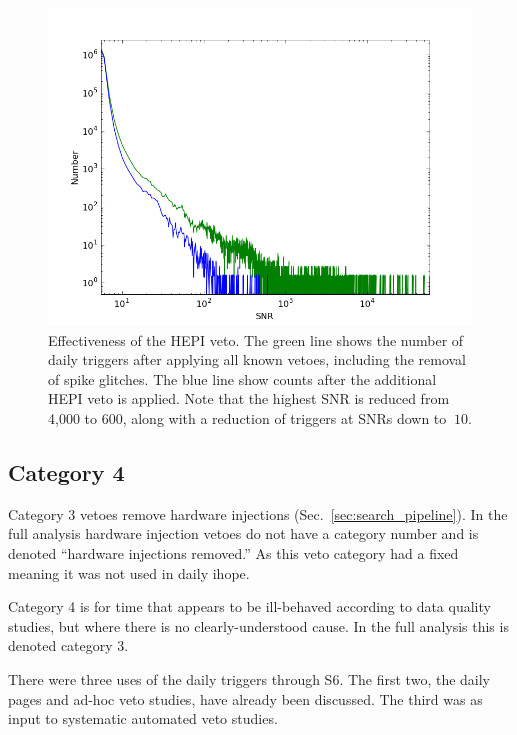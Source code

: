 \begin{figure}
  \includegraphics[width=\linewidth]{figures/detchar/L1-S6B2-snrhist_Cat1234_Spike_HEPI}
  \caption[Effectiveness of the HEPI veto] {
  \label{f:hepi_veto_effectiveness}
Effectiveness of the HEPI veto. The green line shows the number of
daily triggers after applying all known vetoes, including the removal
of spike glitches.  The blue line show counts after the additional
HEPI veto is applied.  Note that the highest SNR is reduced from 
4,000 to 600, along with a reduction of triggers at SNRs down to 
$~ 10$.}
\end{figure}


\subsection{Category 4}

Category 3 vetoes remove hardware injections
(Sec.~\ref{sec:search_pipeline}).  In the full analysis
hardware injection vetoes do not have a category number and is denoted
``hardware injections removed.''  As this veto category had a fixed
meaning it was not used in daily ihope.

Category 4 is for time that appears to be ill-behaved according to 
data quality studies, but where there is no clearly-understood 
cause.  In the full analysis this is denoted category 3.



There were three uses of the daily triggers through S6.  The first
two, the daily pages and ad-hoc veto studies, have already been
discussed.  The third was as input to systematic automated veto
studies.

